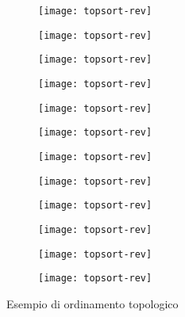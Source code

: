\begin{figure}[H]

	\begin{subfigure}{.15\textwidth}
		\texttt{[image: topsort-rev]}
	\end{subfigure}\hfill
	\begin{subfigure}{.15\textwidth}
		\texttt{[image: topsort-rev]}
	\end{subfigure}\hfill
	\begin{subfigure}{.15\textwidth}
		\texttt{[image: topsort-rev]}
	\end{subfigure}\hfill
	\begin{subfigure}{.15\textwidth}
		\texttt{[image: topsort-rev]}
	\end{subfigure}\hfill
	\begin{subfigure}{.15\textwidth}
		\texttt{[image: topsort-rev]}
	\end{subfigure}\hfill
	\begin{subfigure}{.15\textwidth}
		\texttt{[image: topsort-rev]}
	\end{subfigure}

	\begin{subfigure}{.15\textwidth}
		\texttt{[image: topsort-rev]}
	\end{subfigure}\hfill
	\begin{subfigure}{.15\textwidth}
		\texttt{[image: topsort-rev]}
	\end{subfigure}\hfill
	\begin{subfigure}{.15\textwidth}
		\texttt{[image: topsort-rev]}
	\end{subfigure}\hfill
	\begin{subfigure}{.15\textwidth}
		\texttt{[image: topsort-rev]}
	\end{subfigure}\hfill
	\begin{subfigure}{.15\textwidth}
		\texttt{[image: topsort-rev]}
	\end{subfigure}\hfill
	\begin{subfigure}{.15\textwidth}
		\texttt{[image: topsort-rev]}
	\end{subfigure}

	\caption{Esempio di ordinamento topologico}

\end{figure}

